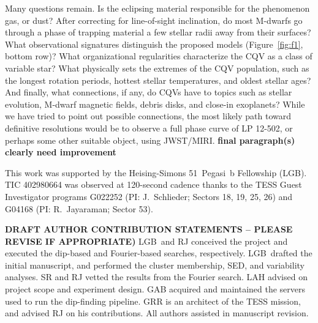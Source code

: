 \documentclass[11pt,twocolumn,tighten]{aastex63}
\begin{document}
Many questions remain.  
Is the eclipsing material responsible for the phenomenon gas, or dust?
After correcting for line-of-sight inclination, do most 
M-dwarfs go through a phase of trapping material a few stellar radii away
from their surfaces?  
What observational
signatures distinguish the proposed models (Figure~\ref{fig:f1},
bottom row)?  What organizational regularities characterize the CQV as
a class of variable star?  What physically sets the extremes of the
CQV population, such as the longest rotation periods, hottest stellar
temperatures, and oldest stellar ages?  And finally, what connections,
if any, do CQVs have to topics such as stellar evolution, M-dwarf
magnetic fields, debris disks, and close-in exoplanets?  While we have
tried to point out possible connections, the most likely path toward
definitive resolutions would be to observe a full phase curve of LP
12-502, or perhaps some other suitable object, using JWST/MIRI.
{\bf final paragraph(s) clearly need improvement}


\acknowledgments
This work was supported by the 
Heising-Simons 51~Pegasi~b Fellowship (LGB).
TIC 402980664 was observed at 120-second cadence thanks to the TESS Guest
Investigator programs G022252 (PI: J.~Schlieder; Sectors 18, 19, 25,
26) and G04168 (PI: R.~Jayaraman; Sector 53).

{\bf DRAFT AUTHOR CONTRIBUTION STATEMENTS -- PLEASE REVISE IF 
	APPROPRIATE)}
LGB~and RJ conceived the project and executed the
dip-based and Fourier-based searches, respectively.
LGB~drafted the initial manuscript, and performed the cluster
membership, SED, and variability analyses.
SR and RJ vetted the results from the Fourier search.
LAH advised on project scope and experiment design.
GAB acquired and maintained the servers used to run the dip-finding
pipeline.
GRR is an architect of the TESS mission, and advised RJ on his contributions.
All authors assisted in manuscript revision.

\end{document}
